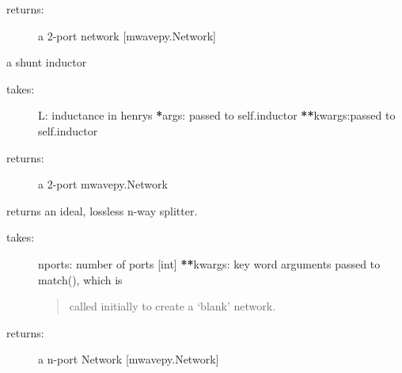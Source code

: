 \documentclass[letterpaper,10pt,english]{sphinxmanual}
\begin{document}
\begin{fulllineitems}
\begin{fulllineitems}
\begin{description}
\item[{returns:}] \leavevmode
a 2-port network {[}mwavepy.Network{]}

\end{description}

\end{fulllineitems}


\begin{fulllineitems}
\label{api/mwavepy.media:mwavepy.media.media.Media.shunt_inductor}
a shunt inductor
\begin{description}
\item[{takes:}] \leavevmode
L: inductance in henrys
{\color{red}\bfseries{}*}args: passed to self.inductor
{\color{red}\bfseries{}**}kwargs:passed to self.inductor

\item[{returns:}] \leavevmode
a 2-port mwavepy.Network

\end{description}

\end{fulllineitems}


\begin{fulllineitems}
\label{api/mwavepy.media:mwavepy.media.media.Media.splitter}
returns an ideal, lossless n-way splitter.
\begin{description}
\item[{takes:}] \leavevmode
nports: number of ports {[}int{]}
{\color{red}\bfseries{}**}kwargs: key word arguments passed to match(), which is
\begin{quote}

called initially to create a `blank' network.
\end{quote}

\item[{returns:}] \leavevmode
a n-port Network {[}mwavepy.Network{]}

\end{description}

\end{fulllineitems}



\end{fulllineitems}
\end{document}

